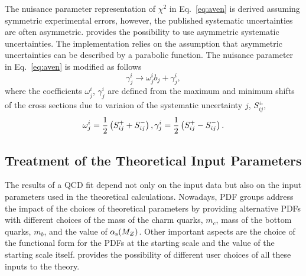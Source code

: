 %
The nuisance parameter representation of $\chi^2$ in Eq.~\ref{eq:aven} is derived assuming 
symmetric experimental errors, however, the published systematic uncertainties are 
often asymmetric.
\fitter provides the possibility to use asymmetric systematic uncertainties.
The implementation relies on the assumption that 
asymmetric uncertainties can be described by a parabolic function.
The nuisance parameter in Eq.~\ref{eq:aven} is modified as follows
\begin{equation}
  \gamma^i_{j} \to \omega^i_{j}b_j + \gamma^i_{j},
\end{equation}
where the coefficients $\omega^i_{j}$, $\gamma^i_{j}$ are defined  
from the maximum and minimum shifts of the cross sections due to variaion of the systematic uncertainty $j$, 
$S_{ij}^{\pm}$,
\begin{equation}
  \omega^i_{j}=\frac{1}{2}\left(S_{ij}^{+}+S_{ij}^{-}\right), \\
  \gamma^i_{j}=\frac{1}{2}\left(S_{ij}^{+}-S_{ij}^{-}\right). 
\end{equation}





\subsection{Treatment of the Theoretical Input Parameters}
\label{sec:theoryerr}

The results of a QCD fit depend not only on the input data but also on the 
input parameters used in the theoretical calculations. Nowadays, PDF groups 
address the impact of the choices of theoretical parameters by providing
alternative PDFs with different choices of the mass of the charm quarks, $m_c$, 
mass of the bottom quarks, $m_b$, and the value of $\alpha_\mathrm{s}(M_Z)$. 
Other important aspects are the choice of the functional form for the PDFs at the 
starting scale and the value of the starting scale itself. \fitter provides the
possibility of different user choices of all these inputs to the theory.

